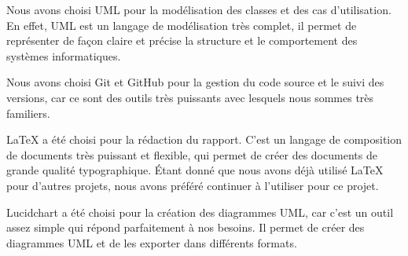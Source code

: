 Nous avons choisi UML pour la modélisation des classes et des cas d'utilisation. En effet, UML
est un langage de modélisation très complet, il permet de représenter de
façon claire et précise la structure et le comportement des systèmes informatiques.

Nous avons choisi Git et GitHub pour la gestion du code source et le suivi des
versions, car ce sont des outils très puissants avec lesquels nous sommes très
familiers.

LaTeX a été choisi pour la rédaction du rapport. C'est un langage de
composition de documents très puissant et flexible, qui permet de créer des
documents de grande qualité typographique.
Étant donné que nous avons déjà utilisé LaTeX pour d'autres projets, nous avons
préféré continuer à l'utiliser pour ce projet.

Lucidchart a été choisi pour la création des diagrammes UML, car c'est un outil assez
simple qui répond parfaitement à nos besoins. Il permet de créer des diagrammes
UML et de les exporter dans différents formats.

